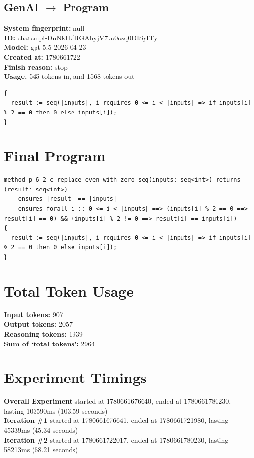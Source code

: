 \documentclass{article}
\begin{document}
\subsection*{GenAI $\rightarrow$ Program}
\textbf{System fingerprint: }null
\\\textbf{ID: }chatcmpl-DnNkILfRGAhyjV7vo0osq0DISyITy
\\\textbf{Model: }gpt-5.5-2026-04-23
\\\textbf{Created at: }1780661722
\\\textbf{Finish reason: }stop
\\\textbf{Usage: }545 tokens in, and 1568 tokens out
\begin{lstlisting}
{
  result := seq(|inputs|, i requires 0 <= i < |inputs| => if inputs[i] % 2 == 0 then 0 else inputs[i]);
}
\end{lstlisting}
\section*{Final Program}
\begin{lstlisting}
method p_6_2_c_replace_even_with_zero_seq(inputs: seq<int>) returns (result: seq<int>)
	ensures |result| == |inputs|
	ensures forall i :: 0 <= i < |inputs| ==> (inputs[i] % 2 == 0 ==> result[i] == 0) && (inputs[i] % 2 != 0 ==> result[i] == inputs[i])
{
  result := seq(|inputs|, i requires 0 <= i < |inputs| => if inputs[i] % 2 == 0 then 0 else inputs[i]);
}
\end{lstlisting}
\section*{Total Token Usage}
\textbf{Input tokens: }907
\\\textbf{Output tokens: }2057
\\\textbf{Reasoning tokens: }1939
\\\textbf{Sum of `total tokens': }2964
\section*{Experiment Timings}
\textbf{Overall Experiment} started at 1780661676640, ended at 1780661780230, lasting 103590ms (103.59 seconds)
\\\textbf{Iteration \#1} started at 1780661676641, ended at 1780661721980, lasting 45339ms (45.34 seconds)
\\\textbf{Iteration \#2} started at 1780661722017, ended at 1780661780230, lasting 58213ms (58.21 seconds)
\end{document}
